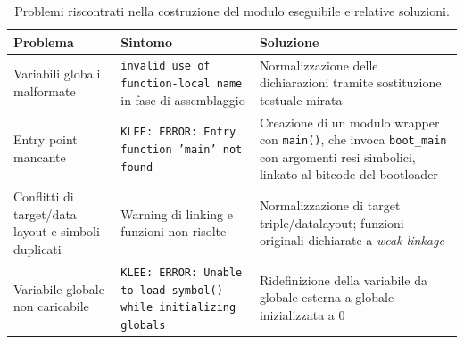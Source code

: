 \begin{table}[h]
\centering
\small
\begin{tabular}{p{3.2cm} p{4.5cm} p{4.8cm}}
\toprule
\textbf{Problema} & \textbf{Sintomo} & \textbf{Soluzione} \\
\midrule
Variabili globali malformate & 
\texttt{invalid use of function-local name} in fase di assemblaggio & 
Normalizzazione delle dichiarazioni tramite sostituzione testuale mirata \\
\midrule
Entry point mancante & 
\texttt{KLEE: ERROR: Entry function 'main' not found} & 
Creazione di un modulo wrapper con \texttt{main()}, che invoca 
\texttt{boot\_main} con argomenti resi simbolici, linkato al bitcode 
del bootloader \\
\midrule
Conflitti di target/data layout e simboli duplicati & 
Warning di linking e funzioni non risolte & 
Normalizzazione di target triple/datalayout; funzioni originali 
dichiarate a \textit{weak linkage} \\
\midrule
Variabile globale non caricabile & 
\texttt{KLEE: ERROR: Unable to load symbol() while initializing globals} & 
Ridefinizione della variabile da globale esterna a globale 
inizializzata a 0 \\
\bottomrule
\end{tabular}
\caption{Problemi riscontrati nella costruzione del modulo eseguibile e relative soluzioni.}
\label{tab:klee-module}
\end{table}